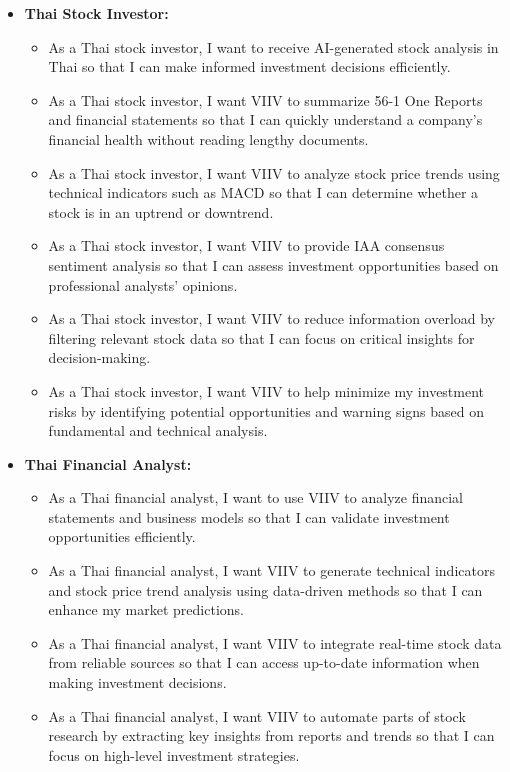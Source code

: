 \begin{itemize}
    \item \textbf{Thai Stock Investor:}  
    \begin{itemize}
        \item As a Thai stock investor, I want to receive AI-generated stock analysis in Thai so that I can make informed investment decisions efficiently.
        \item As a Thai stock investor, I want VIIV to summarize 56-1 One Reports and financial statements so that I can quickly understand a company’s financial health without reading lengthy documents.
        \item As a Thai stock investor, I want VIIV to analyze stock price trends using technical indicators such as MACD so that I can determine whether a stock is in an uptrend or downtrend.
        \item As a Thai stock investor, I want VIIV to provide IAA consensus sentiment analysis so that I can assess investment opportunities based on professional analysts' opinions.
        \item As a Thai stock investor, I want VIIV to reduce information overload by filtering relevant stock data so that I can focus on critical insights for decision-making.
        \item As a Thai stock investor, I want VIIV to help minimize my investment risks by identifying potential opportunities and warning signs based on fundamental and technical analysis.
    \end{itemize}

    \item \textbf{Thai Financial Analyst:}  
    \begin{itemize}
        \item As a Thai financial analyst, I want to use VIIV to analyze financial statements and business models so that I can validate investment opportunities efficiently.
        \item As a Thai financial analyst, I want VIIV to generate technical indicators and stock price trend analysis using data-driven methods so that I can enhance my market predictions.
        \item As a Thai financial analyst, I want VIIV to integrate real-time stock data from reliable sources so that I can access up-to-date information when making investment decisions.
        \item As a Thai financial analyst, I want VIIV to automate parts of stock research by extracting key insights from reports and trends so that I can focus on high-level investment strategies.
    \end{itemize}
\end{itemize}



